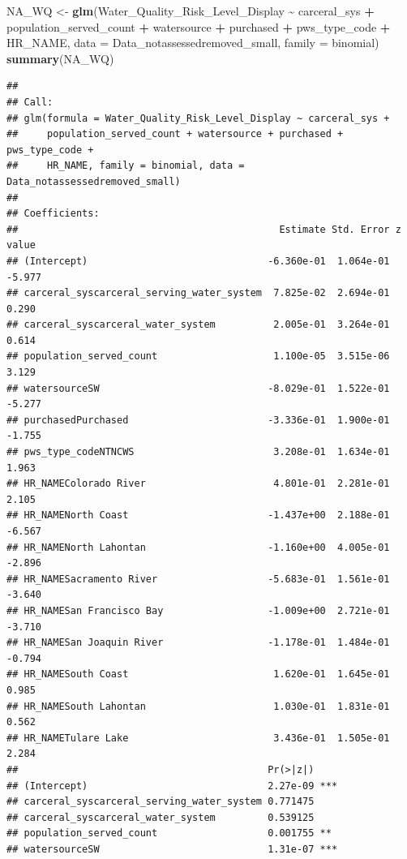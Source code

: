 \documentclass[
]{article}
\newenvironment{Shaded}{\begin{snugshade}}{\end{snugshade}}
\newcommand{\AttributeTok}[1]{\textcolor[rgb]{0.13,0.29,0.53}{#1}}
\newcommand{\FunctionTok}[1]{\textcolor[rgb]{0.13,0.29,0.53}{\textbf{#1}}}
\newcommand{\NormalTok}[1]{#1}
\newcommand{\OtherTok}[1]{\textcolor[rgb]{0.56,0.35,0.01}{#1}}
\newcommand{\SpecialCharTok}[1]{\textcolor[rgb]{0.81,0.36,0.00}{\textbf{#1}}}
\begin{document}
\begin{Shaded}
\begin{Highlighting}[]
\NormalTok{NA\_WQ }\OtherTok{\textless{}{-}} \FunctionTok{glm}\NormalTok{(Water\_Quality\_Risk\_Level\_Display }\SpecialCharTok{\textasciitilde{}}\NormalTok{ carceral\_sys }\SpecialCharTok{+}\NormalTok{ population\_served\_count }\SpecialCharTok{+}\NormalTok{ watersource }\SpecialCharTok{+}\NormalTok{ purchased }\SpecialCharTok{+}\NormalTok{ pws\_type\_code }\SpecialCharTok{+}\NormalTok{ HR\_NAME, }\AttributeTok{data =}\NormalTok{ Data\_notassessedremoved\_small, }\AttributeTok{family =}\NormalTok{ binomial)}
\FunctionTok{summary}\NormalTok{(NA\_WQ)}
\end{Highlighting}
\end{Shaded}

\begin{verbatim}
## 
## Call:
## glm(formula = Water_Quality_Risk_Level_Display ~ carceral_sys + 
##     population_served_count + watersource + purchased + pws_type_code + 
##     HR_NAME, family = binomial, data = Data_notassessedremoved_small)
## 
## Coefficients:
##                                             Estimate Std. Error z value
## (Intercept)                               -6.360e-01  1.064e-01  -5.977
## carceral_syscarceral_serving_water_system  7.825e-02  2.694e-01   0.290
## carceral_syscarceral_water_system          2.005e-01  3.264e-01   0.614
## population_served_count                    1.100e-05  3.515e-06   3.129
## watersourceSW                             -8.029e-01  1.522e-01  -5.277
## purchasedPurchased                        -3.336e-01  1.900e-01  -1.755
## pws_type_codeNTNCWS                        3.208e-01  1.634e-01   1.963
## HR_NAMEColorado River                      4.801e-01  2.281e-01   2.105
## HR_NAMENorth Coast                        -1.437e+00  2.188e-01  -6.567
## HR_NAMENorth Lahontan                     -1.160e+00  4.005e-01  -2.896
## HR_NAMESacramento River                   -5.683e-01  1.561e-01  -3.640
## HR_NAMESan Francisco Bay                  -1.009e+00  2.721e-01  -3.710
## HR_NAMESan Joaquin River                  -1.178e-01  1.484e-01  -0.794
## HR_NAMESouth Coast                         1.620e-01  1.645e-01   0.985
## HR_NAMESouth Lahontan                      1.030e-01  1.831e-01   0.562
## HR_NAMETulare Lake                         3.436e-01  1.505e-01   2.284
##                                           Pr(>|z|)    
## (Intercept)                               2.27e-09 ***
## carceral_syscarceral_serving_water_system 0.771475    
## carceral_syscarceral_water_system         0.539125    
## population_served_count                   0.001755 ** 
## watersourceSW                             1.31e-07 ***

\end{verbatim}
\end{document}
